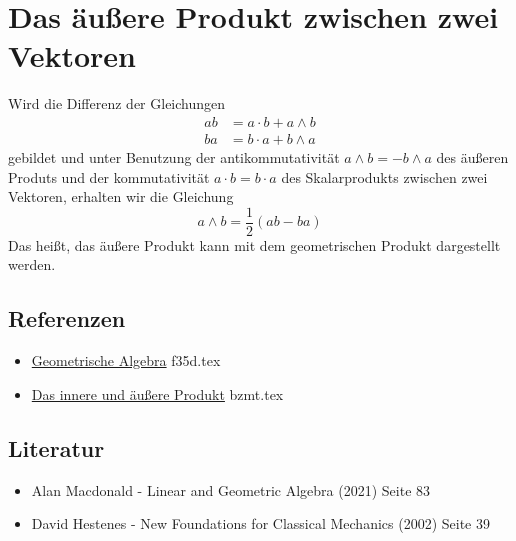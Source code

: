 \documentclass{sajzk}
\begin{document}
\section{Das äußere Produkt zwischen zwei Vektoren} 
\label{x3ca}

Wird die Differenz der Gleichungen
\begin{align*}
  ab &= a\cdot b + a\wedge b \\ 
  ba &= b\cdot a + b\wedge a
\end{align*}
gebildet und unter Benutzung der antikommutativität $a\wedge b = -b\wedge a$ des äußeren
Produts und der kommutativität $a\cdot b = b\cdot a$ des Skalarprodukts
zwischen zwei Vektoren, erhalten wir die
Gleichung
$$ a\wedge b = \frac{1}{2}(ab-ba)$$
Das heißt, das äußere Produkt kann mit dem geometrischen Produkt dargestellt
werden.

\subsection{Referenzen} 
\begin{itemize}
    \item \href{f35d.pdf}{Geometrische Algebra} f35d.tex
    \item \href{bzmt.pdf}{Das innere und äußere Produkt} bzmt.tex
\end{itemize}

\subsection{Literatur}
\begin{itemize}
    \item Alan Macdonald - Linear and Geometric Algebra (2021) Seite 83
    \item David Hestenes - New Foundations for Classical Mechanics (2002) Seite 39
\end{itemize}
\end{document}
